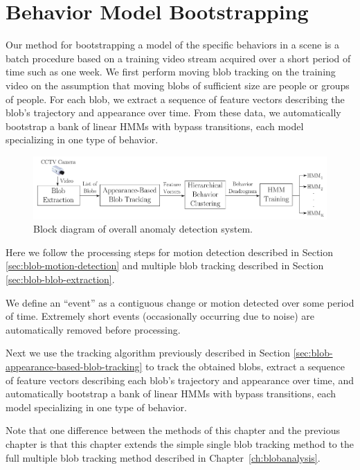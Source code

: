 \section{Behavior Model Bootstrapping}
\label{sec:batch-modeling}

Our method for bootstrapping a model of the specific behaviors in a
scene is a batch procedure based on a training video stream acquired
over a short period of time such as one week.  We first perform moving
blob tracking on the training video on the assumption that moving
blobs of sufficient size are people or groups of people.  For each
blob, we extract a sequence of feature vectors describing the blob's
trajectory and appearance over time.  From these data, we
automatically bootstrap a bank of linear HMMs with bypass transitions, 
each model specializing in one type of behavior.

\begin{figure}[t]
  \centering
  \includegraphics[width=1\linewidth]{figures/behavior-modeling-block-diagram}
  \caption[Block diagram of our overall system.]{\small Block diagram
    of overall anomaly detection system.}
  \label{fig:behavior-modeling-block-diagram}
\end{figure}

Here we follow the processing steps for motion detection described in
Section \ref{sec:blob-motion-detection} and multiple blob tracking described
in Section \ref{sec:blob-blob-extraction}. 

We define an ``event'' as a contiguous change or motion detected over
some period of time. Extremely short events (occasionally occurring
due to noise) are automatically removed before processing.

Next we use the tracking algorithm previously described in
Section \ref{sec:blob-appearance-based-blob-tracking} to track the
obtained blobs, extract a sequence of feature vectors describing each
blob's trajectory and appearance over time, and automatically
bootstrap a bank of linear HMMs with bypass transitions, each model 
specializing in one type of behavior.

Note that one difference between the methods of this chapter and the previous 
chapter is that this chapter extends the simple single blob tracking method to
the full multiple blob tracking method described in Chapter~\ref{ch:blobanalysis}.

